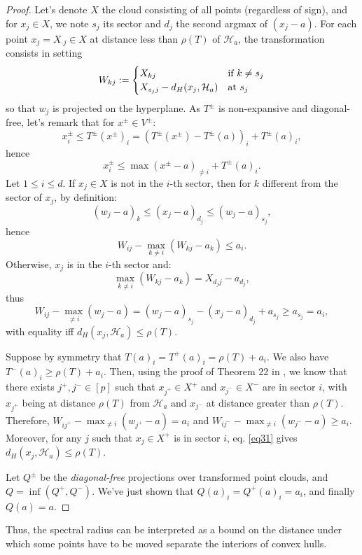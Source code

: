 \documentclass[oneside,english,a4paper]{amsart}
\numberwithin{equation}{section}
\numberwithin{figure}{section}
\theoremstyle{plain}
\theoremstyle{definition}
\theoremstyle{plain}
\theoremstyle{remark}
\theoremstyle{plain}
\theoremstyle{definition}
\theoremstyle{definition}
\begin{document}
\begin{proof}
Let's denote $X$ the cloud consisting of all points (regardless of
sign), and for $x_{j}\in X$, we note $s_{j}$
its sector and $d_{j}$ the second argmax of $(x_{j}-a)$. For each
point $x_{j}=X_{\cdot j}\in X$ at distance less than $\rho(T)$ of
$\mathcal{H}_{a}$, the transformation consists in setting 
\[
W_{kj}:=\begin{cases}
X_{kj} & \text{if \ensuremath{k\ne s_{j}}}\\
X_{s_{j}j}-d_H(x_{j},\mathcal{H}_{a}) & \text{at \ensuremath{s_{j}}}
\end{cases}
\]
so that $w_{j}$ is projected on the hyperplane. As $T^{\pm}$ is
non-expansive and diagonal-free, let's remark that for $x^{\pm}\in V^{\pm}$:
\[
x_{i}^{\pm}\le T^{\pm}(x^{\pm})_{i}=\left(T^{\pm}(x^{\pm})-T^{\pm}(a)\right)_{i}+T^{\pm}(a)_{i},
\]
hence
\begin{equation}
x_{i}^{\pm}\le\max(x^{\pm}-a)_{\ne i}+T^{\pm}(a)_{i}.\label{eq31}
\end{equation}
Let $1\le i\le d$. If $x_{j}\in X$ is not in the $i$-th sector, then
for $k$ different from the sector of $x_{j}$, by definition: 
\[
(w_{j}-a)_{k}\le(x_{j}-a)_{d_{j}}\le(w_{j}-a)_{s_{j}},
\]
hence 
\[
W_{ij}-\max_{k\ne i}\left(W_{kj}-a_{k}\right)\le a_{i}.
\]
Otherwise, $x_{j}$ is in the $i$-th sector and: 
\[
\max_{k\ne i}\left(W_{kj}-a_{k}\right)=X_{d_{j}j}-a_{d_{j}},
\]
thus 
\[
W_{ij}-\max_{\ne i}\left(w_{j}-a\right)=\left(w_{j}-a\right)_{s_{j}}-\left(x_{j}-a\right)_{d_{j}}+a_{s_{j}}\ge a_{s_{j}}=a_{i},
\]
with equality iff $d_H(x_{j},\mathcal{H}_{a})\leq\rho(T)$.

Suppose by symmetry that $T(a)_{i}=T^{+}(a)_{i}=\rho(T)+a_{i}.$ We
also have $T^{-}(a)_{i}\ge\rho(T)+a_{i}$. Then, using the proof of
Theorem 22 in \cite{Akian2021TropicalLR}, we know that there exists
$j^{+},j^{-}\in[p]$ such that $x_{j^{+}}\in X^{+}$ and $x_{j^{-}}\in X^{-}$
are in sector $i$, with $x_{j^{+}}$ being at distance $\rho(T)$
from $\mathcal{H}_{a}$ and $x_{j^{-}}$ at distance greater than $\rho(T)$.
Therefore, $W_{ij^{+}}-\max_{\ne i}\left(w_{j^{+}}-a\right)=a_{i}$
and $W_{ij^{-}}-\max_{\ne i}\left(w_{j^{-}}-a\right)\geq a_{i}$.
Moreover, for any $j$ such that $x_{j}\in X^{+}$ is in sector $i$,
eq. \ref{eq31} gives $d_H(x_{j},\mathcal{H}_{a})\leq\rho(T)$.

Let $Q^{\pm}$ be the \emph{diagonal-free} projections over transformed
point clouds, and $Q=\inf(Q^{+}, Q^{-}).$ We've just shown that $Q(a)_{i}=Q^{+}(a)_{i}=a_{i}$,
and finally $Q(a)=a$.
\end{proof}
%
Thus, the spectral radius can be interpreted as a bound on the distance
under which some points have to be moved separate the interiors of convex hulls.
\end{document}
